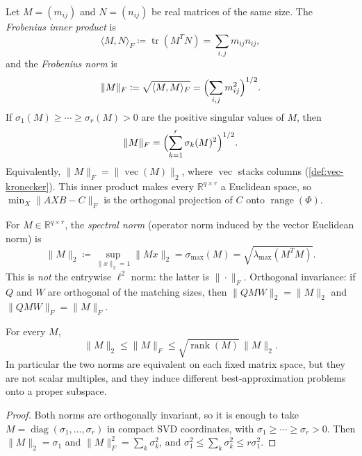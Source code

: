 \documentclass[11pt,a4paper]{article}
\DeclareMathOperator{\rank}{rank}
\DeclareMathOperator{\tr}{tr}
\begin{document}
\begin{definition}
\label{def:frobenius}
Let \(M=(m_{ij})\) and \(N=(n_{ij})\) be real matrices of the same size. The \emph{Frobenius inner product} is
\[
\langle M,N\rangle_{F}
\coloneqq
\tr(M^{T}N)
=
\sum_{i,j} m_{ij}n_{ij},
\]
and the \emph{Frobenius norm} is
\[
\|M\|_{F}
\coloneqq
\sqrt{\langle M,M\rangle_{F}}
=
\Bigl(\sum_{i,j} m_{ij}^{2}\Bigr)^{1/2}.
\]
If \(\sigma_{1}(M)\ge\cdots\ge\sigma_{r}(M)>0\) are the positive singular values of \(M\), then
\[
\|M\|_{F}
=
\Bigl(\sum_{k=1}^{r}\sigma_{k}(M)^{2}\Bigr)^{1/2}.
\]
Equivalently, \(\|M\|_{F}=\|\operatorname{vec}(M)\|_{2}\), where \(\operatorname{vec}\) stacks columns (\cref{def:vec-kronecker}). This inner product makes every \(\mathbb{R}^{q\times r}\) a Euclidean space, so \(\min_{X}\|AXB-C\|_{F}\) is the orthogonal projection of \(C\) onto \(\operatorname{range}(\Phi)\).
\end{definition}

\begin{definition}
\label{def:spectral}
For \(M\in\mathbb{R}^{q\times r}\), the \emph{spectral norm} (operator norm induced by the vector Euclidean norm) is
\[
\|M\|_{2}
\coloneqq
\sup_{\|x\|_{2}=1}\|Mx\|_{2}
=
\sigma_{\max}(M)
=
\sqrt{\lambda_{\max}(M^{T}M)}.
\]
This is \emph{not} the entrywise \(\ell^{2}\) norm: the latter is \(\|\cdot\|_{F}\). Orthogonal invariance: if \(Q\) and \(W\) are orthogonal of the matching sizes, then \(\|QMW\|_{2}=\|M\|_{2}\) and \(\|QMW\|_{F}=\|M\|_{F}\).
\end{definition}

\begin{lemma}
\label{lem:norm-compare}
For every \(M\),
\[
\|M\|_{2}
\le
\|M\|_{F}
\le
\sqrt{\rank(M)}\,\|M\|_{2}.
\]
In particular the two norms are equivalent on each fixed matrix space, but they are not scalar multiples, and they induce different best-approximation problems onto a proper subspace.
\end{lemma}

\begin{proof}
Both norms are orthogonally invariant, so it is enough to take \(M=\operatorname{diag}(\sigma_{1},\ldots,\sigma_{r})\) in compact SVD coordinates, with \(\sigma_{1}\ge\cdots\ge\sigma_{r}>0\). Then \(\|M\|_{2}=\sigma_{1}\) and \(\|M\|_{F}^{2}=\sum_{k}\sigma_{k}^{2}\), and \(\sigma_{1}^{2}\le\sum_{k}\sigma_{k}^{2}\le r\sigma_{1}^{2}\).
\end{proof}
\end{document}
